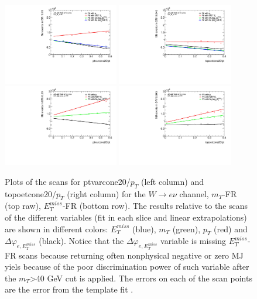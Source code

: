\begin{figure}[htbp]
\centering
\includegraphics[width=0.45\textwidth]{figures/mj/slicesScanFit_SR_M_T_ptvar_el.pdf}
\includegraphics[width=0.45\textwidth]{figures/mj/slicesScanFit_SR_M_T_topoet_el.pdf}
\\
\includegraphics[width=0.45\textwidth]{figures/mj/slicesScanFit_SR_met_reco_et_ptvar_el.pdf}
\includegraphics[width=0.45\textwidth]{figures/mj/slicesScanFit_SR_met_reco_et_topoet_el.pdf}
\caption{
 Plots of the scans for ptvarcone20/$p_T$ (left column) and topoetcone20/$p_T$ (right column) for the $W\rightarrow e\nu$ channel, $m_T$-FR (top raw), $E_T^{miss}$-FR (bottom row).
 The results relative to the scans of the different variables (fit in each slice and linear extrapolations) are shown in different colors: $E_T^{miss}$ (blue), $m_T$ (green), $p_T$ (red) and $\Delta\varphi_{e,E_T^{miss}}$ (black).
 Notice that the $\Delta\varphi_{e,E_T^{miss}}$ variable is missing $E_T^{miss}$-FR scans because 
 returning often nonphysical negative or zero MJ yiels because of the poor discrimination power of such variable after the $m_T$>40 GeV cut is applied.
 The errors on each of the scan points are the error from the template fit .
}
\label{fig:mj_extrapolation_wenu}
\end{figure}

